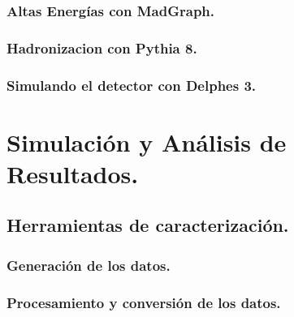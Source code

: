 \documentclass[12pt,english]{report}
\begin{document}
		
		\subsection{Altas Energías con MadGraph.}\label{C_madgraph}
		

		\subsection{Hadronizacion con Pythia 8.}\label{C_pythia8}
		

		\subsection{Simulando el detector con Delphes 3.}\label{C_delphes}
		


\chapter{Simulación y Análisis de Resultados.}


    \section{Herramientas de caracterización.}
    
    
        \subsection{Generación de los datos.}\label{Cap_genera}
        
        
        \subsection{Procesamiento y conversión de los datos.}
        
        
\end{document}
